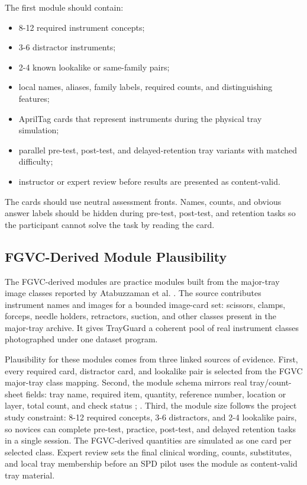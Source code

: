 \documentclass[10pt,a4paper]{article}
\begin{document}
The first module should contain:
\begin{itemize}
  \item 8-12 required instrument concepts;
  \item 3-6 distractor instruments;
  \item 2-4 known lookalike or same-family pairs;
  \item local names, aliases, family labels, required counts, and distinguishing features;
  \item AprilTag cards that represent instruments during the physical tray simulation;
  \item parallel pre-test, post-test, and delayed-retention tray variants with matched difficulty;
  \item instructor or expert review before results are presented as content-valid.
\end{itemize}
The cards should use neutral assessment fronts. Names, counts, and obvious
answer labels should be hidden during pre-test, post-test, and retention tasks
so the participant cannot solve the task by reading the card.
\subsection{FGVC-Derived Module Plausibility}


The FGVC-derived modules are practice modules built from the major-tray image
classes reported by Atabuzzaman et al. \cite{atabuzzaman-et-al-2025}. The
source contributes instrument names and images for a bounded image-card set:
scissors, clamps, forceps, needle holders, retractors, suction, and other
classes present in the major-tray archive. It gives TrayGuard a coherent pool of
real instrument classes photographed under one dataset program.

Plausibility for these modules comes from three linked sources of evidence.
First, every required card, distractor card, and lookalike pair is selected from
the FGVC major-tray class mapping. Second, the module schema mirrors real
tray/count-sheet fields: tray name, required item, quantity, reference number,
location or layer, total count, and check status
\cite{stryker-gamma4-count-sheet-2023};
\cite{stryker-imn-count-sheet-2023}. Third, the module size follows the project
study constraint: 8-12 required concepts, 3-6 distractors, and 2-4 lookalike
pairs, so novices can complete pre-test, practice, post-test, and delayed
retention tasks in a single session. The FGVC-derived quantities are simulated
as one card per selected class. Expert review sets the final clinical wording,
counts, substitutes, and local tray membership before an SPD pilot uses the
module as content-valid tray material.
\end{document}
